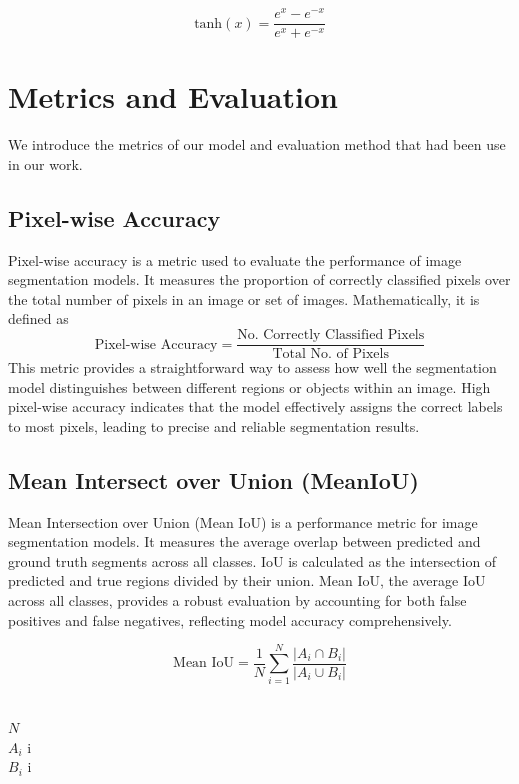 \documentclass[conference]{IEEEtran}
\begin{document}
\[
\text{tanh}(x) = \frac{e^x - e^{-x}}{e^x + e^{-x}}
\]

\section{Metrics and Evaluation}
We introduce the metrics of our model and evaluation method that had been use in our work.

\subsection{Pixel-wise Accuracy}

Pixel-wise accuracy is a metric used to evaluate the performance of image segmentation models. It measures the proportion of correctly classified pixels over the total number of pixels in an image or set of images. Mathematically, it is defined as
\[
\text{Pixel-wise Accuracy} = \frac{\text{No. Correctly Classified Pixels}}{\text{Total No. of Pixels}}
\]
This metric provides a straightforward way to assess how well the segmentation model distinguishes between different regions or objects within an image. High pixel-wise accuracy indicates that the model effectively assigns the correct labels to most pixels, leading to precise and reliable segmentation results.

\subsection{Mean Intersect over Union (MeanIoU)}

Mean Intersection over Union (Mean IoU) is a performance metric for image segmentation models. It measures the average overlap between predicted and ground truth segments across all classes. IoU is calculated as the intersection of predicted and true regions divided by their union. Mean IoU, the average IoU across all classes, provides a robust evaluation by accounting for both false positives and false negatives, reflecting model accuracy comprehensively.

\[
\text{Mean IoU} = \frac{1}{N} \sum_{i=1}^{N} \frac{|A_i \cap B_i|}{|A_i \cup B_i|}
\]

 \\
$N$  \\
$A_i$  i \\
$B_i$  i
\end{document}
